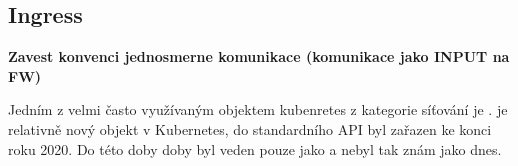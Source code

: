 
\subsection{Ingress}
\textbf{Zavest konvenci jednosmerne komunikace (komunikace jako INPUT na FW)}

Jedním z velmi často využívaným objektem kubenretes z kategorie síťování je .  je relativně nový objekt v Kubernetes, do standardního API byl zařazen ke konci roku 2020\cite{k8scirobot_2020_merge}. Do této doby doby byl veden pouze jako \cite{kashin_2021_gateway} a nebyl tak znám jako dnes.

